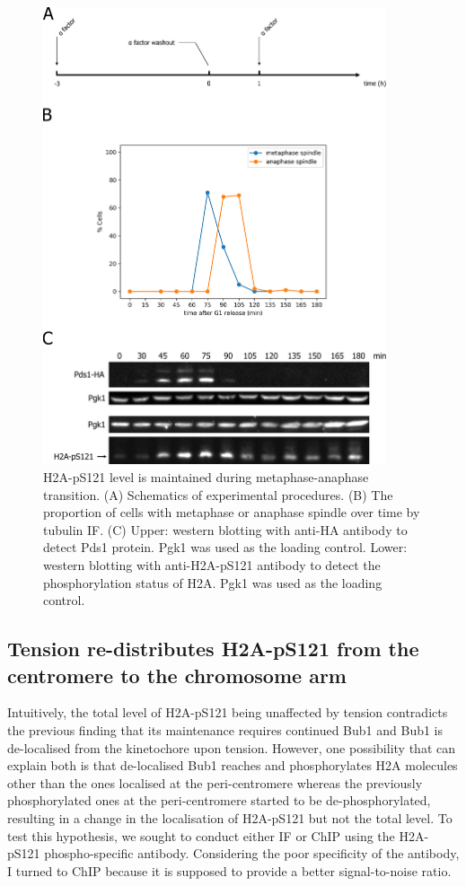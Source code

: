 \begin{figure}[htbp]
  \centering
  \includegraphics[width=0.9\textwidth]{chapter3/figures/pH2A mitotic time course.pdf}
  \caption[H2A-pS121 level is maintained during metaphase-anaphase transition]{H2A-pS121 level is maintained during metaphase-anaphase transition. (A) Schematics of experimental procedures. (B) The proportion of cells with metaphase or anaphase spindle over time by tubulin IF. (C) Upper: western blotting with anti-HA antibody to detect Pds1 protein. Pgk1 was used as the loading control. Lower: western blotting with anti-H2A-pS121 antibody to detect the phosphorylation status of H2A. Pgk1 was used as the loading control.}
  \label{fig:ph2atimecourse}
\end{figure}

\subsection{Tension re-distributes H2A-pS121 from the centromere to the chromosome arm}

Intuitively, the total level of H2A-pS121 being unaffected by tension contradicts the previous finding that its maintenance requires continued Bub1 and Bub1 is de-localised from the kinetochore upon tension. However, one possibility that can explain both is that de-localised Bub1 reaches and phosphorylates H2A molecules other than the ones localised at the peri-centromere whereas the previously phosphorylated ones at the peri-centromere started to be de-phosphorylated, resulting in a change in the localisation of H2A-pS121 but not the total level. To test this hypothesis, we sought to conduct either IF or ChIP using the H2A-pS121 phospho-specific antibody. Considering the poor specificity of the antibody, I turned to ChIP because it is supposed to provide a better signal-to-noise ratio. 

